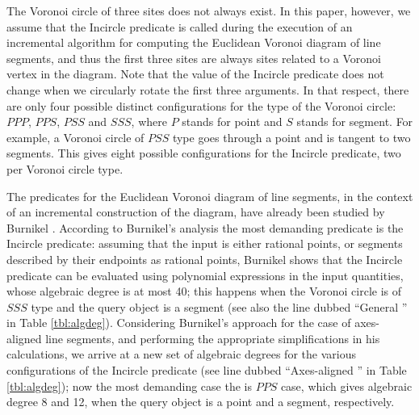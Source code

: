 \documentclass[letterpaper,11pt]{article}
\newcommand{\incircle}{\textsf{Incircle}\xspace}
\newcommand{\vor}{Voronoi\xspace}
\newcommand{\ppp}{$PPP$\xspace}
\newcommand{\pps}{$PPS$\xspace}
\newcommand{\pss}{$PSS$\xspace}
\newcommand{\sss}{$SSS$\xspace}
\newcommand{\pppp}{$PPPP$\xspace}
\newcommand{\ppsp}{$PPSP$\xspace}
\newcommand{\pssp}{$PSSP$\xspace}
\newcommand{\sssp}{$SSSP$\xspace}
\newcommand{\ppps}{$PPPS$\xspace}
\newcommand{\ppss}{$PPSS$\xspace}
\newcommand{\psss}{$PSSS$\xspace}
\newcommand{\ssss}{$SSSS$\xspace}
\begin{document}
The \vor circle of three sites does not always exist. In
this paper, however, we assume that the \incircle predicate is called
during the execution of an incremental algorithm for computing the
Euclidean Voronoi diagram of line segments, and thus the first three
sites are always sites related to a \vor vertex in the diagram.
Note that the value of the \incircle predicate does not change when we
circularly rotate the first three arguments. In that respect, there
are only four possible distinct configurations for the type of the \vor
circle: \ppp, \pps, \pss and \sss, where $P$ stands for point and $S$
stands for segment. For example, a \vor circle of \pss type goes
through a point and is tangent to two segments. This gives eight
possible configurations for the \incircle predicate, two per \vor circle
type.

The predicates for the Euclidean \vor diagram of line segments, in the
context of an incremental construction of the diagram, have already
been studied by Burnikel \cite{b-ecvdl-96}. According to Burnikel's
analysis the most demanding predicate is the \incircle
predicate: assuming that the input is either rational points, or
segments described by their endpoints as rational points, Burnikel
shows that the \incircle predicate can be evaluated using polynomial
expressions in the input quantities, whose algebraic degree is at most
40; this happens when the \vor circle is of \sss type and the query
object is a segment (see also the line dubbed ``General
\cite{b-ecvdl-96}'' in Table \ref{tbl:algdeg}). Considering Burnikel's
approach for the case of axes-aligned line segments, and performing
the appropriate simplifications in his calculations, we arrive at a
new set of algebraic degrees for the various configurations of the
\incircle predicate (see line dubbed ``Axes-aligned
\cite{b-ecvdl-96}'' in Table \ref{tbl:algdeg}); now the most demanding
case the is \pps case, which gives algebraic degree 8 and 12, when the
query object is a point and a segment, respectively. 

\begin{comment}
\begin{table*}[ht]
  \begin{center}
    \begin{tabular}{|c||c|c|c|c||c|c|c|c|}\hline
      Predicate $\rightarrow$ & \multicolumn{4}{c||}{$p$-incircle}
      &\multicolumn{4}{c|}{$s$-incircle}\\\cline{2-9}
      Configuration $\downarrow$& \pppp & \ppsp & \pssp & \sssp
      & \ppps & \ppss & \psss & \ssss\\\hline
      General \cite{b-ecvdl-96}&4&12&16&32&8&24&32&40\\
      Axes-aligned \cite{b-ecvdl-96}&4&8&4&2&6&12&4&2\\
      Axes-aligned [this paper]&4&6&4&2&6&6&4&2\\\hline
    \end{tabular}
  \end{center}
  \caption{Maximum algebraic degrees.}
  \label{tbl:algdeg}
\end{table*}
\end{comment}
\end{document}
